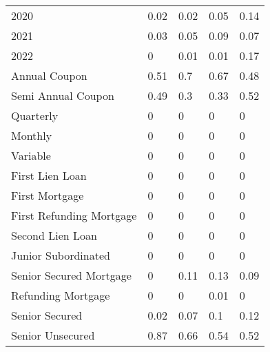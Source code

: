 \begin{table}[h!]
\begin{tabular}{lllll}
\cellcolor[HTML]{FFFFFF}2020 & \cellcolor[HTML]{F9FBFC}0.02 & \cellcolor[HTML]{F9FBFC}0.02 & \cellcolor[HTML]{F4F9F8}0.05 & \cellcolor[HTML]{E4F3EA}0.14 \\
\cellcolor[HTML]{FFFFFF}2021 & \cellcolor[HTML]{F7FAFB}0.03 & \cellcolor[HTML]{F4F9F8}0.05 & \cellcolor[HTML]{EDF6F2}0.09 & \cellcolor[HTML]{F0F8F5}0.07 \\
\cellcolor[HTML]{FFFFFF}2022 & \cellcolor[HTML]{FCFCFF}0 & \cellcolor[HTML]{FBFCFE}0.01 & \cellcolor[HTML]{FBFCFE}0.01 & \cellcolor[HTML]{DFF0E6}0.17 \\
\cellcolor[HTML]{FFFFFF}Annual Coupon & \cellcolor[HTML]{A3D8B2}0.51 & \cellcolor[HTML]{81CB95}0.7 & \cellcolor[HTML]{87CD9A}0.67 & \cellcolor[HTML]{A8DAB7}0.48 \\
\cellcolor[HTML]{FFFFFF}Semi Annual   Coupon & \cellcolor[HTML]{A6DAB5}0.49 & \cellcolor[HTML]{C8E7D2}0.3 & \cellcolor[HTML]{C2E5CD}0.33 & \cellcolor[HTML]{A1D7B1}0.52 \\
\rowcolor[HTML]{FCFCFF} 
\cellcolor[HTML]{FFFFFF}Quarterly & 0 & 0 & 0 & 0 \\
\rowcolor[HTML]{FCFCFF} 
\cellcolor[HTML]{FFFFFF}Monthly & 0 & 0 & 0 & 0 \\
\rowcolor[HTML]{FCFCFF} 
\cellcolor[HTML]{FFFFFF}Variable & 0 & 0 & 0 & 0 \\
\rowcolor[HTML]{FCFCFF} 
\cellcolor[HTML]{FFFFFF}First Lien Loan & 0 & 0 & 0 & 0 \\
\rowcolor[HTML]{FCFCFF} 
\cellcolor[HTML]{FFFFFF}First Mortgage & 0 & 0 & 0 & 0 \\
\rowcolor[HTML]{FCFCFF} 
\cellcolor[HTML]{FFFFFF}First   Refunding Mortgage & 0 & 0 & 0 & 0 \\
\rowcolor[HTML]{FCFCFF} 
\cellcolor[HTML]{FFFFFF}Second Lien Loan & 0 & 0 & 0 & 0 \\
\rowcolor[HTML]{FCFCFF} 
\cellcolor[HTML]{FFFFFF}Junior   Subordinated & 0 & 0 & 0 & 0 \\
\cellcolor[HTML]{FFFFFF}Senior   Secured Mortgage & \cellcolor[HTML]{FCFCFF}0 & \cellcolor[HTML]{E9F5EF}0.11 & \cellcolor[HTML]{E6F3EC}0.13 & \cellcolor[HTML]{EDF6F2}0.09 \\
\rowcolor[HTML]{FCFCFF} 
\cellcolor[HTML]{FFFFFF}Refunding   Mortgage & 0 & 0 & \cellcolor[HTML]{FBFCFE}0.01 & 0 \\
\cellcolor[HTML]{FFFFFF}Senior Secured & \cellcolor[HTML]{F9FBFC}0.02 & \cellcolor[HTML]{F0F8F5}0.07 & \cellcolor[HTML]{EBF5F0}0.1 & \cellcolor[HTML]{E7F4ED}0.12 \\
\cellcolor[HTML]{FFFFFF}Senior Unsecured & \cellcolor[HTML]{63BE7B}0.87 & \cellcolor[HTML]{88CD9B}0.66 & \cellcolor[HTML]{9ED6AE}0.54 & \cellcolor[HTML]{A1D7B1}0.52 \\

\end{tabular}
\end{table}
